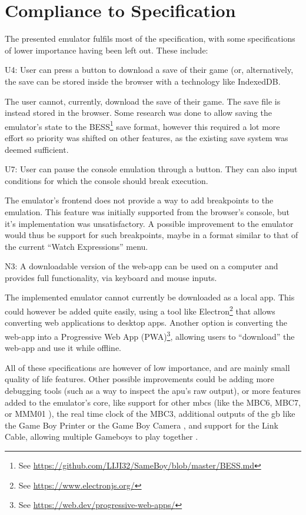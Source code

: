 \documentclass[11pt]{informatics-report}
\newcommand{\ftnt}[1]{\footnote{See \url{#1}}}
\begin{document}
\section{Compliance to Specification}

The presented emulator fulfils most of the specification, with some specifications of lower importance having been left out. These include:

\begin{compactitem}
	\item
		U4: User can press a button to download a save of their game (or, alternatively, the save can be stored inside the browser with a technology like IndexedDB.

		The user cannot, currently, download the save of their game. The save file is instead stored in the browser. Some research was done to allow saving the emulator's state to the BESS\ftnt{https://github.com/LIJI32/SameBoy/blob/master/BESS.md} save format, however this required a lot more effort so priority was shifted on other features, as the existing save system was deemed sufficient.

	\item
		U7: User can pause the console emulation through a button. They can also input conditions for which the console should break execution.

		The emulator's frontend does not provide a way to add breakpoints to the emulation. This feature was initially supported from the browser's console, but it's implementation was unsatisfactory. A possible improvement to the emulator would thus be support for such breakpoints, maybe in a format similar to that of the current ``Watch Expressions'' menu.

	\item
		N3: A  downloadable version of the web-app can be used on a computer and provides full functionality, via keyboard and mouse inputs.

		The implemented emulator cannot currently be downloaded as a local app. This could however be added quite easily, using a tool like Electron\ftnt{https://www.electronjs.org/} that allows converting web applications to desktop apps. Another option is converting the web-app into a Progressive Web App (PWA)\ftnt{https://web.dev/progressive-web-apps/}, allowing users to ``download'' the web-app and use it while offline.
\end{compactitem}

All of these specifications are however of low importance, and are mainly small quality of life features. Other possible improvements could be adding more debugging tools (such as a way to inspect the \gls{apu}'s raw output), or more features added to the emulator's core, like support for other \glspl{mbc} (like the MBC6, MBC7, or MMM01 \cite[MBCs]{pandoc}), the real time clock of the MBC3, additional outputs of the \gls{gb} like the Game Boy Printer or the Game Boy Camera \cite{pandoc}, and support for the Link Cable, allowing multiple Gameboys to play together \cite[Serial Data Transfer]{pandoc}.
\end{document}
